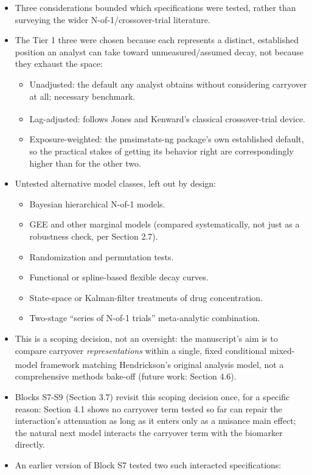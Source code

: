 \documentclass[
  11pt,
]{article}
\providecommand{\tightlist}{%
  \setlength{\itemsep}{0pt}\setlength{\parskip}{0pt}}
\begin{document}
\begin{itemize}
\tightlist
\item
  Three considerations bounded which specifications were tested,
  rather than surveying the wider N-of-1/crossover-trial literature.
\item
  The Tier 1 three were chosen because each represents a distinct,
  established position an analyst can take toward unmeasured/assumed
  decay, not because they exhaust the space:

  \begin{itemize}
  \tightlist
  \item
    Unadjusted: the default any analyst obtains without considering
    carryover at all; necessary benchmark.
  \item
    Lag-adjusted: follows Jones and Kenward's\textsuperscript{} classical crossover-trial device.
  \item
    Exposure-weighted: the pmsimstats-ng package's own established
    default, so the practical stakes of getting its behavior right
    are correspondingly higher than for the other two.
  \end{itemize}
\item
  Untested alternative model classes, left out by design:

  \begin{itemize}
  \tightlist
  \item
    Bayesian hierarchical N-of-1 models.
  \item
    GEE and other marginal models (compared systematically, not just
    as a robustness check, per Section 2.7).
  \item
    Randomization and permutation tests.
  \item
    Functional or spline-based flexible decay curves.
  \item
    State-space or Kalman-filter treatments of drug concentration.
  \item
    Two-stage ``series of N-of-1 trials'' meta-analytic combination.
  \end{itemize}
\item
  This is a scoping decision, not an oversight: the manuscript's aim
  is to compare carryover \emph{representations} within a single, fixed
  conditional mixed-model framework matching Hendrickson's\textsuperscript{} original analysis model, not a comprehensive
  methods bake-off (future work: Section 4.6).
\item
  Blocks S7-S9 (Section 3.7) revisit this scoping decision once, for
  a specific reason: Section 4.1 shows no carryover term tested so
  far can repair the interaction's attenuation as long as it enters
  only as a nuisance main effect; the natural next model interacts
  the carryover term with the biomarker directly.
\item
  An earlier version of Block S7 tested two such interacted
  specifications:


\end{itemize}
\end{document}

